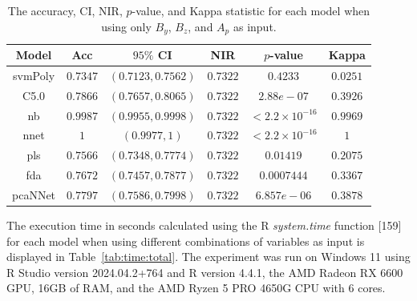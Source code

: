 \documentclass[sn-mathphys-num]{sn-jnl}%
\begin{document}
\begin{table}[!ht]
    \centering
    \caption{The accuracy, CI, NIR, $p$-value, and Kappa statistic for each model when using only $B_{y}$, $B_{z}$, and $A_{p}$ as input.}
	\label{tab:stats:reverse:yzap}
	\begin{tabular}{|c|c|c|c|c|c|}
		\hline
		Model & Acc & $95\%$ CI & NIR & $p$-value & Kappa \\ \hline
		svmPoly & $0.7347$ & $(0.7123, 0.7562)$ & $0.7322$ & $0.4233$ & $0.0251$ \\ \hline
		C5.0 & $0.7866$ & $(0.7657, 0.8065)$ & $0.7322$ & $2.88e-07$ & $0.3926$ \\ \hline
		nb & $0.9987$ & $(0.9955, 0.9998)$ & $0.7322$ & $< 2.2 \times {10}^{-16}$ & $0.9969$ \\ \hline
		nnet & $1$ & $(0.9977, 1)$ & $0.7322$ & $< 2.2 \times {10}^{-16}$ & $1$ \\ \hline
		pls & $0.7566$ & $(0.7348, 0.7774)$ & $0.7322$ & $0.01419$ & $0.2075$ \\ \hline
		fda & $0.7672$ & $(0.7457, 0.7877)$ & $0.7322$ & $0.0007444$ & $0.3367$ \\ \hline
		pcaNNet & $0.7797$ & $(0.7586, 0.7998)$ & $0.7322$ & $6.857e-06$ & $0.3878$ \\ \hline
	\end{tabular}
\end{table}

The execution time in seconds calculated using the R \textit{system.time} function [159] for each model when using different combinations of variables as input is displayed in Table~\ref{tab:time:total}. The experiment was run on Windows 11 using R Studio version 2024.04.2+764 and R version 4.4.1, the AMD Radeon RX 6600 GPU, 16GB of RAM, and the AMD Ryzen 5 PRO 4650G CPU with 6 cores.
\end{document}
